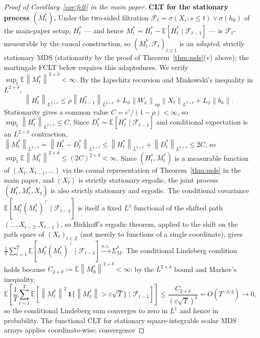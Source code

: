\documentclass[bj,authoryear]{imsart}
\theoremstyle{plain}
\theoremstyle{definition}
\newcommand{\E}{\mathbb{E}}
\newcommand{\F}{\mathcal{F}}
\newcommand{\Z}{\mathbb{Z}}
\newcommand{\norm}[1]{\left\lVert #1 \right\rVert}
\newcommand{\given}{\mid}
\begin{document}
\begin{proof}[Proof of Corollary~\ref{cor:fclt} in the main paper]
  \textbf{CLT for the stationary process $(M_t^*)$.}
  Under the two-sided filtration
  $\F_t = \sigma(X_s:s\leq t)\vee\sigma(h_0)$ of the main-paper setup,
  $H_t^*$ --- and hence $M_t^* = H_t^* - \E[H_t^*\given\F_{t-1}]$ --- is
  $\F_t$-measurable by the causal construction, so
  $(M_t^*, \F_t)_{t\geq 1}$ is an \emph{adapted}, strictly stationary MDS
  (stationarity by the proof of Theorem~\ref{thm:mds}(v) above); the
  martingale FCLT below requires this adaptedness.
  We verify $\sup_t\E\norm{M_t^*}^{2+\delta}<\infty$.
  By the Lipschitz recursion and Minkowski's inequality in $L^{2+\delta}$,
  \[
    \norm{H_t^*}_{L^{2+\delta}}
    \leq \rho\norm{H_{t-1}^*}_{L^{2+\delta}}
       + L_\phi\norm{W_x}_{\mathrm{op}}\norm{X_t}_{L^{2+\delta}}
       + L_\phi\norm{b_h}.
  \]
  Stationarity gives a common value $C = c'/(1-\rho) < \infty$, so $\sup_t\norm{H_t^*}_{L^{2+\delta}} \leq C$.
  Since $D_t^* = \E[H_t^*\given\F_{t-1}]$ and conditional expectation is an $L^{2+\delta}$ contraction,
  $\norm{M_t^*}_{L^{2+\delta}} = \norm{H_t^* - D_t^*}_{L^{2+\delta}} \leq \norm{H_t^*}_{L^{2+\delta}} + \norm{D_t^*}_{L^{2+\delta}} \leq 2C$,
  so $\sup_t\E\norm{M_t^*}^{2+\delta} \leq (2C)^{2+\delta} < \infty$.
  Since $(H_t^*, M_t^*)$ is a measurable function of $(X_t, X_{t-1}, \ldots)$ via the causal representation of Theorem~\ref{thm:mds} in the main paper, and $(X_t)$ is strictly stationary ergodic, the joint process $(H_t^*, M_t^*, X_t)$ is also strictly stationary and ergodic.
  The conditional covariance
  $\E[M_t^*(M_t^*)^\top\given\F_{t-1}]$ is itself a fixed $L^1$ functional
  of the shifted path $(\ldots,X_{t-2},X_{t-1})$, so Birkhoff's ergodic
  theorem, applied to the shift on the path space of $(X_t)_{t\in\Z}$
  (not merely to functions of a single coordinate), gives
  $\frac{1}{T}\sum_{t=1}^T\E[M_t^*(M_t^*)^\top\given\F_{t-1}] \xrightarrow{a.s.} \Sigma_M^*$.
  The conditional Lindeberg condition holds because $C_{2+\delta}:=\E\norm{M_0^*}^{2+\delta}<\infty$:
  by the $L^{2+\delta}$ bound and Markov's inequality,
  \[
    \E\!\left[\frac{1}{T}\sum_{t=1}^T
    \E\!\left[\norm{M_t^*}^2\,\mathbf{1}\{\norm{M_t^*}>\varepsilon\sqrt{T}\}
       \given\F_{t-1}\right]\right]
    \leq \frac{C_{2+\delta}}{(\varepsilon\sqrt{T})^\delta} = O(T^{-\delta/2}) \to 0,
  \]
  so the conditional Lindeberg sum converges to zero in $L^1$ and hence in probability.
  The functional CLT for stationary square-integrable scalar MDS arrays
  \citep[Theorem~4.1]{hall1980martingale} applies coordinate-wise; convergence

\end{proof}
\end{document}
